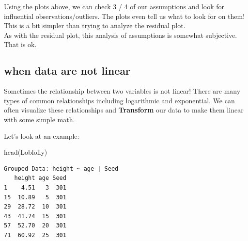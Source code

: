 \documentclass[
  letterpaper,
  DIV=11,
  numbers=noendperiod]{scrartcl}
\newenvironment{Shaded}{\begin{snugshade}}{\end{snugshade}}
\newcommand{\FunctionTok}[1]{\textcolor[rgb]{0.28,0.35,0.67}{#1}}
\newcommand{\NormalTok}[1]{\textcolor[rgb]{0.00,0.23,0.31}{#1}}
\begin{document}
\hfill\break
Using the plots above, we can check 3 / 4 of our assumptions and look
for influential observations/outliers. The plots even tell us what to
look for on them! This is a bit simpler than trying to analyze the
residual plot.\\
As with the residual plot, this analysis of assumptions is somewhat
subjective. That is ok.

\subsection{\texorpdfstring{\textbf{when data are not
linear}}{when data are not linear}}

Sometimes the relationship between two variables is not linear! There
are many types of common relationships including logarithmic and
exponential. We can often visualize these relationships and
\textbf{Transform} our data to make them linear with some simple math.

Let's look at an example:

\begin{Shaded}
\begin{Highlighting}[]
\FunctionTok{head}\NormalTok{(Loblolly)}
\end{Highlighting}
\end{Shaded}

\begin{verbatim}
Grouped Data: height ~ age | Seed
   height age Seed
1    4.51   3  301
15  10.89   5  301
29  28.72  10  301
43  41.74  15  301
57  52.70  20  301
71  60.92  25  301
\end{verbatim}
\end{document}
